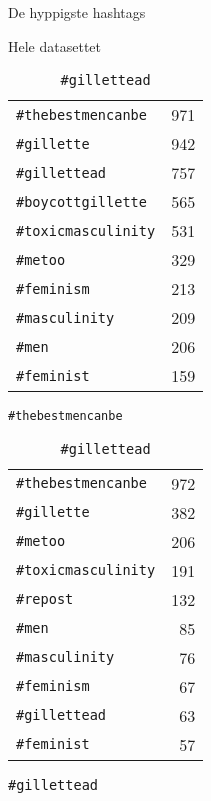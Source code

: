 \begin{table}[H]
    \footnotesize
    \caption{De hyppigste hashtags }
    \begin{subtable}{.25\linewidth}
\centering
\captionsetup{justification=centering,singlelinecheck=off}
\caption{
  Hele datasettet
}
\begin{tabular}{lr}

\texttt{\#thebestmencanbe}  & 971 \\
\texttt{\#gillette}         & 942 \\
\texttt{\#gillettead}       & 757 \\
\texttt{\#boycottgillette}  & 565 \\
\texttt{\#toxicmasculinity} & 531 \\
\texttt{\#metoo}            & 329 \\
\texttt{\#feminism}         & 213 \\
\texttt{\#masculinity}      & 209 \\
\texttt{\#men}              & 206 \\
\texttt{\#feminist}         & 159 \\

\end{tabular}
    \end{subtable}%
    \begin{subtable}{.25\linewidth}
\centering
\captionsetup{justification=centering,singlelinecheck=off}
\caption{
  \texttt{\#thebestmencanbe}
}
\begin{tabular}{lr}
\texttt{\#thebestmencanbe}   & 972 \\
\texttt{\#gillette}          & 382 \\
\texttt{\#metoo}             & 206 \\
\texttt{\#toxicmasculinity}  & 191 \\
\texttt{\#repost}            & 132 \\
\texttt{\#men}               & 85 \\
\texttt{\#masculinity}       & 76 \\
\texttt{\#feminism}          & 67 \\
\texttt{\#gillettead}        & 63 \\
\texttt{\#feminist}          & 57 \\

\end{tabular}
    \end{subtable}%
    \begin{subtable}{.25\linewidth}
\centering
\captionsetup{justification=centering,singlelinecheck=off}
\caption{
  \texttt{\#gillettead}
}
\begin{tabular}{lr}


\end{tabular}
\end{subtable}
\end{table}
